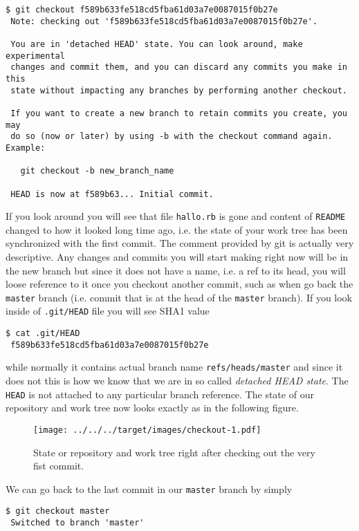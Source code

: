 \documentclass{article}
\theoremstyle{definition}
\begin{document}
        \begin{Verbatim}[frame=single]
 $ git checkout f589b633fe518cd5fba61d03a7e0087015f0b27e
 Note: checking out 'f589b633fe518cd5fba61d03a7e0087015f0b27e'.

 You are in 'detached HEAD' state. You can look around, make experimental
 changes and commit them, and you can discard any commits you make in this
 state without impacting any branches by performing another checkout.

 If you want to create a new branch to retain commits you create, you may
 do so (now or later) by using -b with the checkout command again. Example:

   git checkout -b new_branch_name

 HEAD is now at f589b63... Initial commit.
        \end{Verbatim}
        If you look around you will see that file \texttt{hallo.rb} is gone and content of \texttt{README} changed to
        how it looked long time ago, i.e. the state of your work tree has been synchronized with the first commit. The
        comment provided by git is actually very descriptive. Any changes and commits you will start making right now
        will be in the new branch but since it does not have a name, i.e. a ref to its head, you will loose reference 
        to it once you checkout another commit, such as when go back the \texttt{master} branch (i.e. commit that is at 
        the head of the \texttt{master} branch). If you look inside of \texttt{.git/HEAD} file you will see SHA1 value

        \begin{Verbatim}[frame=single]
 $ cat .git/HEAD
 f589b633fe518cd5fba61d03a7e0087015f0b27e
        \end{Verbatim}
        while normally it contains actual branch name \texttt{refs/heads/master} and since it does not this is how we know
        that we are in so called {\em detached HEAD state}. The \texttt{HEAD} is not attached to any particular branch
        reference. The state of our repository and work tree now looks exactly as in the following figure.

        \begin{figure}[h]
        \centering\texttt{[image: ../../../target/images/checkout-1.pdf]}
        \caption{State or repository and work tree right after checking out the very fist commit.\label{fig:checkout-1}}
        \end{figure}
        \newpage
        \noindent We can go back to the last commit in our \texttt{master} branch by simply
        \begin{Verbatim}[frame=single]
 $ git checkout master
 Switched to branch 'master'
        \end{Verbatim}
\end{document}
